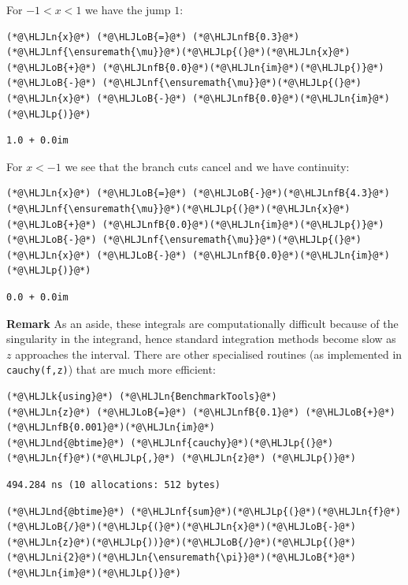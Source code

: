 \documentclass[12pt,a4paper]{article}
\newcommand{\HLJLk}[1]{\textcolor[RGB]{148,91,176}{\textbf{#1}}}
\newcommand{\HLJLn}[1]{#1}
\newcommand{\HLJLnd}[1]{\textcolor[RGB]{214,102,97}{#1}}
\newcommand{\HLJLnf}[1]{\textcolor[RGB]{66,102,213}{#1}}
\newcommand{\HLJLnfB}[1]{\textcolor[RGB]{59,151,46}{#1}}
\newcommand{\HLJLni}[1]{\textcolor[RGB]{59,151,46}{#1}}
\newcommand{\HLJLoB}[1]{\textcolor[RGB]{102,102,102}{\textbf{#1}}}
\newcommand{\HLJLp}[1]{#1}
\begin{document}
For $-1 < x < 1$ we have the jump $1$:


\begin{lstlisting}
(*@\HLJLn{x}@*) (*@\HLJLoB{=}@*) (*@\HLJLnfB{0.3}@*)
(*@\HLJLnf{\ensuremath{\mu}}@*)(*@\HLJLp{(}@*)(*@\HLJLn{x}@*) (*@\HLJLoB{+}@*) (*@\HLJLnfB{0.0}@*)(*@\HLJLn{im}@*)(*@\HLJLp{)}@*) (*@\HLJLoB{-}@*) (*@\HLJLnf{\ensuremath{\mu}}@*)(*@\HLJLp{(}@*)(*@\HLJLn{x}@*) (*@\HLJLoB{-}@*) (*@\HLJLnfB{0.0}@*)(*@\HLJLn{im}@*)(*@\HLJLp{)}@*)
\end{lstlisting}

\begin{lstlisting}
1.0 + 0.0im
\end{lstlisting}


For $x < -1$ we see that the branch cuts cancel and we have continuity:


\begin{lstlisting}
(*@\HLJLn{x}@*) (*@\HLJLoB{=}@*) (*@\HLJLoB{-}@*)(*@\HLJLnfB{4.3}@*)
(*@\HLJLnf{\ensuremath{\mu}}@*)(*@\HLJLp{(}@*)(*@\HLJLn{x}@*) (*@\HLJLoB{+}@*) (*@\HLJLnfB{0.0}@*)(*@\HLJLn{im}@*)(*@\HLJLp{)}@*) (*@\HLJLoB{-}@*) (*@\HLJLnf{\ensuremath{\mu}}@*)(*@\HLJLp{(}@*)(*@\HLJLn{x}@*) (*@\HLJLoB{-}@*) (*@\HLJLnfB{0.0}@*)(*@\HLJLn{im}@*)(*@\HLJLp{)}@*)
\end{lstlisting}

\begin{lstlisting}
0.0 + 0.0im
\end{lstlisting}


\textbf{Remark} As an aside, these integrals are computationally difficult because of the singularity in the integrand,  hence standard integration methods become slow as $z$ approaches the interval.  There are other specialised routines (as implemented in \texttt{cauchy(f,z)}) that are much more efficient:


\begin{lstlisting}
(*@\HLJLk{using}@*) (*@\HLJLn{BenchmarkTools}@*)
(*@\HLJLn{z}@*) (*@\HLJLoB{=}@*) (*@\HLJLnfB{0.1}@*) (*@\HLJLoB{+}@*)(*@\HLJLnfB{0.001}@*)(*@\HLJLn{im}@*)
(*@\HLJLnd{@btime}@*) (*@\HLJLnf{cauchy}@*)(*@\HLJLp{(}@*)(*@\HLJLn{f}@*)(*@\HLJLp{,}@*) (*@\HLJLn{z}@*) (*@\HLJLp{)}@*)
\end{lstlisting}

\begin{lstlisting}
494.284 ns (10 allocations: 512 bytes)
\end{lstlisting}


\begin{lstlisting}
(*@\HLJLnd{@btime}@*) (*@\HLJLnf{sum}@*)(*@\HLJLp{(}@*)(*@\HLJLn{f}@*)(*@\HLJLoB{/}@*)(*@\HLJLp{(}@*)(*@\HLJLn{x}@*)(*@\HLJLoB{-}@*)(*@\HLJLn{z}@*)(*@\HLJLp{))}@*)(*@\HLJLoB{/}@*)(*@\HLJLp{(}@*)(*@\HLJLni{2}@*)(*@\HLJLn{\ensuremath{\pi}}@*)(*@\HLJLoB{*}@*)(*@\HLJLn{im}@*)(*@\HLJLp{)}@*)
\end{lstlisting}
\end{document}
